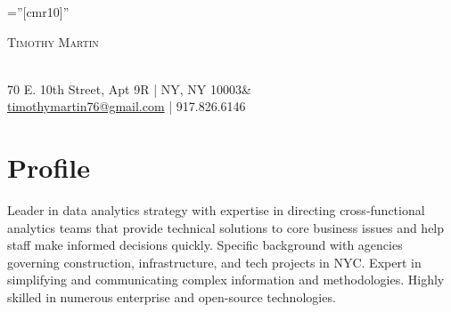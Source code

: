 \documentclass[a4paper,10pt]{article}
\begin{document}
\pagestyle{empty} %
\font\fb=''[cmr10]'' %


\par{\centering
		{\huge\textsc{Timothy} \textsc{Martin}
	}\par}
	
	\par{\centering
		{\footnotesize\\{70 E. 10th Street, Apt 9R | NY, NY 10003}& \\\href{mailto:timothymartin76@gmail.com}{timothymartin76@gmail.com} | 917.826.6146
	}\par}



\section{Profile}
\small {Leader in data analytics strategy with expertise in directing cross-functional analytics teams that provide technical solutions to core business issues and help staff make informed decisions quickly. Specific background with agencies governing construction, infrastructure, and tech projects in NYC. Expert in simplifying and communicating complex information and methodologies. Highly skilled in numerous enterprise and open-source technologies.
} 
\end{document}
